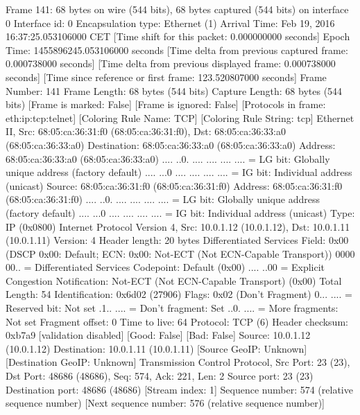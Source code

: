 Frame 141: 68 bytes on wire (544 bits), 68 bytes captured (544 bits) on interface 0
    Interface id: 0
    Encapsulation type: Ethernet (1)
    Arrival Time: Feb 19, 2016 16:37:25.053106000 CET
    [Time shift for this packet: 0.000000000 seconds]
    Epoch Time: 1455896245.053106000 seconds
    [Time delta from previous captured frame: 0.000738000 seconds]
    [Time delta from previous displayed frame: 0.000738000 seconds]
    [Time since reference or first frame: 123.520807000 seconds]
    Frame Number: 141
    Frame Length: 68 bytes (544 bits)
    Capture Length: 68 bytes (544 bits)
    [Frame is marked: False]
    [Frame is ignored: False]
    [Protocols in frame: eth:ip:tcp:telnet]
    [Coloring Rule Name: TCP]
    [Coloring Rule String: tcp]
Ethernet II, Src: 68:05:ca:36:31:f0 (68:05:ca:36:31:f0), Dst: 68:05:ca:36:33:a0 (68:05:ca:36:33:a0)
    Destination: 68:05:ca:36:33:a0 (68:05:ca:36:33:a0)
        Address: 68:05:ca:36:33:a0 (68:05:ca:36:33:a0)
        .... ..0. .... .... .... .... = LG bit: Globally unique address (factory default)
        .... ...0 .... .... .... .... = IG bit: Individual address (unicast)
    Source: 68:05:ca:36:31:f0 (68:05:ca:36:31:f0)
        Address: 68:05:ca:36:31:f0 (68:05:ca:36:31:f0)
        .... ..0. .... .... .... .... = LG bit: Globally unique address (factory default)
        .... ...0 .... .... .... .... = IG bit: Individual address (unicast)
    Type: IP (0x0800)
Internet Protocol Version 4, Src: 10.0.1.12 (10.0.1.12), Dst: 10.0.1.11 (10.0.1.11)
    Version: 4
    Header length: 20 bytes
    Differentiated Services Field: 0x00 (DSCP 0x00: Default; ECN: 0x00: Not-ECT (Not ECN-Capable Transport))
        0000 00.. = Differentiated Services Codepoint: Default (0x00)
        .... ..00 = Explicit Congestion Notification: Not-ECT (Not ECN-Capable Transport) (0x00)
    Total Length: 54
    Identification: 0x6d02 (27906)
    Flags: 0x02 (Don't Fragment)
        0... .... = Reserved bit: Not set
        .1.. .... = Don't fragment: Set
        ..0. .... = More fragments: Not set
    Fragment offset: 0
    Time to live: 64
    Protocol: TCP (6)
    Header checksum: 0xb7a9 [validation disabled]
        [Good: False]
        [Bad: False]
    Source: 10.0.1.12 (10.0.1.12)
    Destination: 10.0.1.11 (10.0.1.11)
    [Source GeoIP: Unknown]
    [Destination GeoIP: Unknown]
Transmission Control Protocol, Src Port: 23 (23), Dst Port: 48686 (48686), Seq: 574, Ack: 221, Len: 2
    Source port: 23 (23)
    Destination port: 48686 (48686)
    [Stream index: 1]
    Sequence number: 574    (relative sequence number)
    [Next sequence number: 576    (relative sequence number)]

